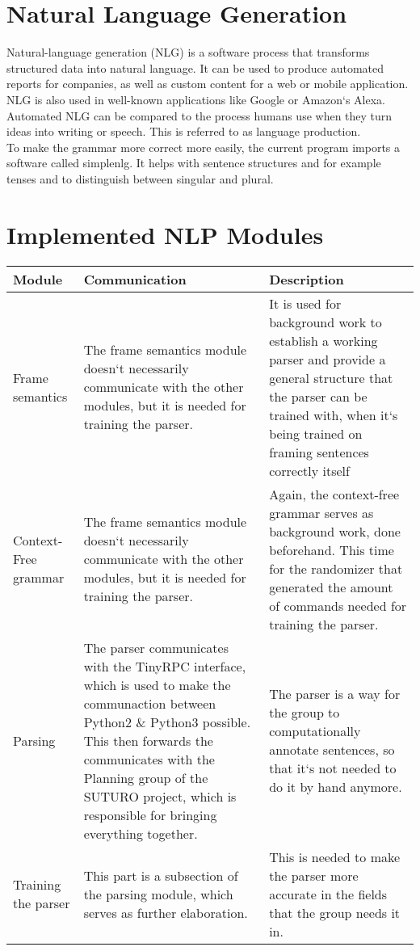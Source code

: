 \documentclass[main.tex]{subfiles}
\begin{document}
	\section{Natural Language Generation}
	Natural-language generation (NLG) is a software process that transforms structured data into natural language. It can be used to produce automated reports for companies, as well as custom content for a web or mobile application. NLG is also used in well-known applications like Google or Amazon‘s Alexa.\\
	Automated NLG can be compared to the process humans use when they turn ideas into writing or speech. This is referred to as language production.\\
	To make the grammar more correct more easily, the current program imports a software called simplenlg. It helps with sentence structures and for example tenses and to distinguish between singular and plural.\\

	 \section{Implemented NLP Modules}
	 	
	 	\begin{tabular}{ | p{3cm} | p{5cm} | p{5cm} | } 
	 		\hline 
	 		\textbf{Module} & \textbf{Communication} & \textbf{Description} \\ 
	 		\hline 
	 		Frame semantics & The frame semantics  module doesn‘t necessarily communicate with the other modules, but it is needed for training the parser. & It is used for background work to establish a working parser and provide a general structure that the parser can be trained with, when it‘s being trained on framing sentences correctly itself \\ 
	 		\hline 
	 		Context-Free grammar & The frame semantics  module doesn‘t necessarily communicate with the other modules, but it is needed for training the parser. & Again, the context-free grammar serves as background work, done beforehand. This time for the randomizer that generated the amount of commands needed for training the parser. \\
	 		\hline 
	 		Parsing & The parser communicates with the TinyRPC interface, which is used to make the communaction between Python2 \& Python3 possible. This then forwards the communicates with the Planning group of the SUTURO project, which is responsible for bringing everything together. & The parser is a way for the group to computationally annotate sentences, so that it‘s not needed to do it by hand anymore.\\
	 		\hline 
	 		Training the parser & This part is a subsection of the parsing module, which serves as further elaboration. & This is needed to make the parser more accurate in the fields that the group needs it in.\\
	 		\hline 
	 	\end{tabular} 
\end{document}
